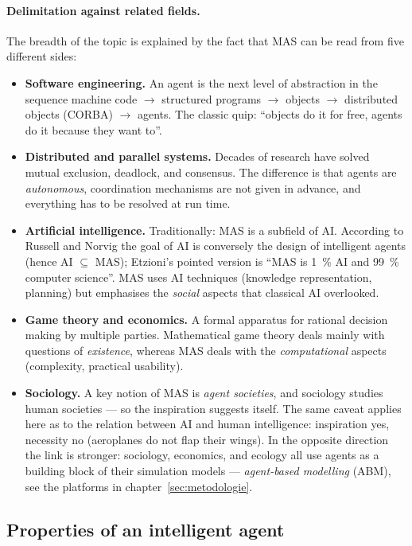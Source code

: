\documentclass[11pt,a4paper]{article}
\theoremstyle{definition}
\providecommand{\uv}[1]{``#1''}
\begin{document}
\paragraph{Delimitation against related fields.} The breadth of the topic is explained by the
fact that MAS can be read from five different sides:
\begin{itemize}
\item \textbf{Software engineering.} An agent is the next level of abstraction in the sequence
  machine code $\to$ structured programs $\to$ objects $\to$ distributed objects (CORBA)
  $\to$ agents. The classic quip: \uv{objects do it for free, agents do it because they want to}.
\item \textbf{Distributed and parallel systems.} Decades of research have solved mutual exclusion,
  deadlock, and consensus. The difference is that agents are \emph{autonomous}, coordination
  mechanisms are not given in advance, and everything has to be resolved at run time.
\item \textbf{Artificial intelligence.} Traditionally: MAS is a subfield of AI. According to
  Russell and Norvig the goal of AI is conversely the design of intelligent agents (hence
  AI $\subseteq$ MAS); Etzioni's pointed version is \uv{MAS is 1~\% AI and 99~\% computer
  science}. MAS uses AI techniques (knowledge representation, planning) but emphasises the
  \emph{social} aspects that classical AI overlooked.
\item \textbf{Game theory and economics.} A formal apparatus for rational decision making by
  multiple parties. Mathematical game theory deals mainly with questions of \emph{existence},
  whereas MAS deals with the \emph{computational} aspects (complexity, practical usability).
\item \textbf{Sociology.} A key notion of MAS is \emph{agent societies}, and sociology studies
  human societies --- so the inspiration suggests itself. The same caveat applies here as to the
  relation between AI and human intelligence: inspiration yes, necessity no (aeroplanes do not
  flap their wings). In the opposite direction the link is stronger: sociology, economics, and
  ecology all use agents as a building block of their simulation models --- \emph{agent-based
  modelling} (ABM), see the platforms in chapter~\ref{sec:metodologie}.
\end{itemize}
\subsection{Properties of an intelligent agent}
\end{document}
